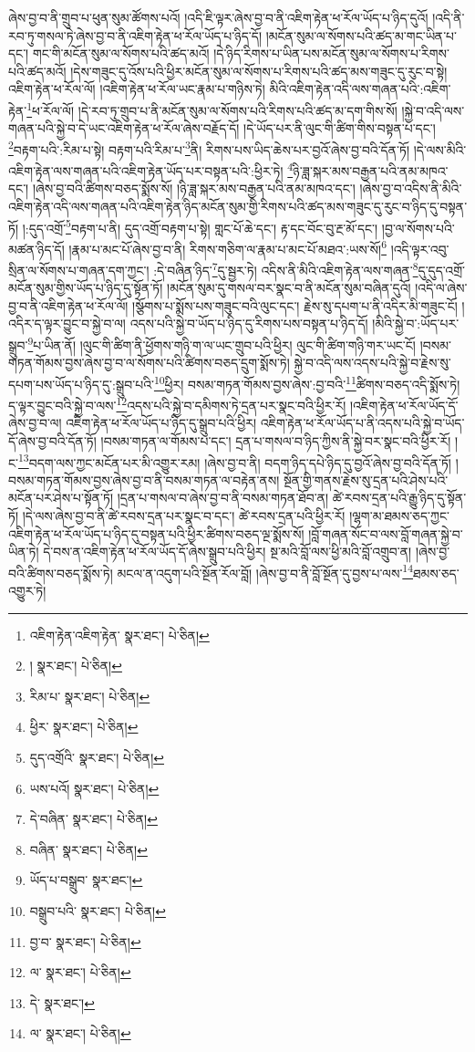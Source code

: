 ཞེས་བྱ་བ་ནི་གྲུབ་པ་ཕུན་སུམ་ཚོགས་པའོ། །འདི་ཇི་ལྟར་ཞེས་བྱ་བ་ནི་འཇིག་རྟེན་ཕ་རོལ་ཡོད་པ་ཉིད་དུའོ། །འདི་ནི་རབ་ཏུ་གསལ་ཏེ་ཞེས་བྱ་བ་ནི་འཇིག་རྟེན་ཕ་རོལ་ཡོད་པ་ཉིད་དོ། །མངོན་སུམ་ལ་སོགས་པའི་ཚད་མ་གང་ཡིན་པ་དང་། གང་གི་མངོན་སུམ་ལ་སོགས་པའི་ཚད་མའོ། །དེ་ཉིད་རིགས་པ་ཡིན་པས་མངོན་སུམ་ལ་སོགས་པ་རིགས་པའི་ཚད་མའོ། །དེས་གཟུང་དུ་འོས་པའི་ཕྱིར་མངོན་སུམ་ལ་སོགས་པ་རིགས་པའི་ཚད་མས་གཟུང་དུ་རུང་བ་སྟེ། འཇིག་རྟེན་ཕ་རོལ་ལོ། །འཇིག་རྟེན་ཕ་རོལ་ཡང་རྣམ་པ་གཉིས་ཏེ། མིའི་འཇིག་རྟེན་འདི་ལས་གཞན་པའི་:འཇིག་རྟེན་\footnote{འཇིག་རྟེན་འཇིག་རྟེན་  སྣར་ཐང་།  པེ་ཅིན། }ཕ་རོལ་ལོ། །དེ་རབ་ཏུ་གྲུབ་པ་ནི་མངོན་སུམ་ལ་སོགས་པའི་རིགས་པའི་ཚད་མ་དག་གིས་སོ། །སྐྱེ་བ་འདི་ལས་གཞན་པའི་སྐྱེ་བ་དེ་ཡང་འཇིག་རྟེན་ཕ་རོལ་ཞེས་བརྗོད་དོ། །དེ་ཡོད་པར་ནི་ལུང་གི་ཚིག་གིས་བསྟན་པ་དང་། \footnote{།    སྣར་ཐང་།  པེ་ཅིན། }བརྟག་པའི་:རིམ་པ་སྟེ། བརྟག་པའི་རིམ་པ་\footnote{རིམ་པ་  སྣར་ཐང་།  པེ་ཅིན། }ནི། རིགས་པས་ཡིད་ཆེས་པར་བྱའོ་ཞེས་བྱ་བའི་དོན་ཏོ། །དེ་ལས་མིའི་འཇིག་རྟེན་ལས་གཞན་པའི་འཇིག་རྟེན་ཡོད་པར་བསྟན་པའི་:ཕྱིར་ཏེ། \footnote{ཕྱིར་  སྣར་ཐང་།  པེ་ཅིན། }ཉི་ཟླ་སྐར་མས་བརྒྱན་པའི་ནམ་མཁའ་དང་། །ཞེས་བྱ་བའི་ཚིགས་བཅད་སྨོས་སོ། །ཉི་ཟླ་སྐར་མས་བརྒྱན་པའི་ནམ་མཁའ་དང་། །ཞེས་བྱ་བ་འདིས་ནི་མིའི་འཇིག་རྟེན་འདི་ལས་གཞན་པའི་འཇིག་རྟེན་ཉིད་མངོན་སུམ་གྱི་རིགས་པའི་ཚད་མས་གཟུང་དུ་རུང་བ་ཉིད་དུ་བསྟན་ཏོ། །:དུད་འགྲོ་\footnote{དུད་འགྲོའི་  སྣར་ཐང་།  པེ་ཅིན། }བརྟག་པ་ནི། དུད་འགྲོ་བརྟག་པ་སྟེ། གླང་པོ་ཆེ་དང་། རྟ་དང་བོང་བུ་རྔ་མོ་དང་། །བྱ་ལ་སོགས་པའི་མཚན་ཉིད་དོ། །རྣམ་པ་མང་པོ་ཞེས་བྱ་བ་ནི། རིགས་གཅིག་ལ་རྣམ་པ་མང་པོ་མཐའ་:ཡས་སོ།\footnote{ཡས་པའོ།  སྣར་ཐང་།  པེ་ཅིན། } །འདི་ལྟར་འབུ་སྲིན་ལ་སོགས་པ་གཞན་དག་ཀྱང་། :དེ་བཞིན་ཉིད་\footnote{དེ་བཞིན་  སྣར་ཐང་།  པེ་ཅིན། }དུ་སྦྱར་ཏེ། འདིས་ནི་མིའི་འཇིག་རྟེན་ལས་གཞན་\footnote{བཞིན་  སྣར་ཐང་།  པེ་ཅིན། }དུ་དུད་འགྲོ་མངོན་སུམ་གྱིས་ཡོད་པ་ཉིད་དུ་སྟོན་ཏོ། །མངོན་སུམ་དུ་གསལ་བར་སྣང་བ་ནི་མངོན་སུམ་བཞིན་དུའོ། །འདི་ལ་ཞེས་བྱ་བ་ནི་འཇིག་རྟེན་ཕ་རོལ་ལོ། །སྩོགས་པ་སྨོས་པས་གཟུང་བའི་ལུང་དང་། རྗེས་སུ་དཔག་པ་ནི་འདིར་མི་གཟུང་ངོ། །འདིར་ད་ལྟར་བྱུང་བ་སྐྱེ་བ་ལ། འདས་པའི་སྐྱེ་བ་ཡོད་པ་ཉིད་དུ་རིགས་པས་བསྟན་པ་ཉིད་དོ། །མིའི་སྐྱེ་བ་:ཡོད་པར་སྒྲུབ་\footnote{ཡོད་པ་བསྒྲུབ་  སྣར་ཐང་། }པ་ཡིན་ནོ། །ལུང་གི་ཚིག་ནི་ཕྱོགས་གཉི་ག་ལ་ཡང་གྲུབ་པའི་ཕྱིར། ལུང་གི་ཚིག་གཉི་གར་ཡང་ངོ། །བསམ་གཏན་གོམས་བྱས་ཞེས་བྱ་བ་ལ་སོགས་པའི་ཚིགས་བཅད་དྲུག་སྨོས་ཏེ། སྐྱེ་བ་འདི་ལས་འདས་པའི་སྐྱེ་བ་རྗེས་སུ་དཔག་པས་ཡོད་པ་ཉིད་དུ་:སྒྲུབ་པའི་\footnote{བསྒྲུབ་པའི་  སྣར་ཐང་།  པེ་ཅིན། }ཕྱིར། བསམ་གཏན་གོམས་བྱས་ཞེས་:བྱ་བའི་\footnote{བྱ་བ་  སྣར་ཐང་།  པེ་ཅིན། }ཚིགས་བཅད་འདི་སྨོས་ཏེ། ད་ལྟར་བྱུང་བའི་སྐྱེ་བ་ལས་\footnote{ལ་  སྣར་ཐང་།  པེ་ཅིན། }འདས་པའི་སྐྱེ་བ་དམིགས་ཏེ་དྲན་པར་སྣང་བའི་ཕྱིར་རོ། །འཇིག་རྟེན་ཕ་རོལ་ཡོད་དོ་ཞེས་བྱ་བ་ལ། འཇིག་རྟེན་ཕ་རོལ་ཡོད་པ་ཉིད་དུ་སྒྲུབ་པའི་ཕྱིར། འཇིག་རྟེན་ཕ་རོལ་ཡོད་པ་ནི་འདས་པའི་སྐྱེ་བ་ཡོད་དོ་ཞེས་བྱ་བའི་དོན་ཏོ། །བསམ་གཏན་ལ་གོམས་པ་དང་། དྲན་པ་གསལ་བ་ཉིད་ཀྱིས་ནི་སྐྱེ་བར་སྣང་བའི་ཕྱིར་རོ། །ང་\footnote{དེ་  སྣར་ཐང་། }བདག་ལས་ཀྱང་མངོན་པར་མི་འགྱུར་རམ། །ཞེས་བྱ་བ་ནི། བདག་ཉིད་དཔེ་ཉིད་དུ་བྱའོ་ཞེས་བྱ་བའི་དོན་ཏོ། །བསམ་གཏན་གོམས་བྱས་ཞེས་བྱ་བ་ནི་བསམ་གཏན་ལ་བརྟེན་ནས། སྔོན་གྱི་གནས་རྗེས་སུ་དྲན་པའི་ཤེས་པའི་མངོན་པར་ཤེས་པ་སྟོན་ཏོ། །དྲན་པ་གསལ་བ་ཞེས་བྱ་བ་ནི་བསམ་གཏན་ཐོབ་ན། ཚེ་རབས་དྲན་པའི་རྒྱུ་ཉིད་དུ་སྟོན་ཏོ། །དེ་ལས་ཞེས་བྱ་བ་ནི་ཚེ་རབས་དྲན་པར་སྣང་བ་དང་། ཚེ་རབས་དྲན་པའི་ཕྱིར་རོ། །ལྷག་མ་ཐམས་ཅད་ཀྱང་འཇིག་རྟེན་ཕ་རོལ་ཡོད་པ་ཉིད་དུ་བསྟན་པའི་ཕྱིར་ཚིགས་བཅད་ལྔ་སྨོས་སོ། །བློ་གཞན་སོང་བ་ལས་བློ་གཞན་སྐྱེ་བ་ཡིན་ཏེ། དེ་བས་ན་འཇིག་རྟེན་ཕ་རོལ་ཡོད་དོ་ཞེས་སྒྲུབ་པའི་ཕྱིར། སྔ་མའི་བློ་ལས་ཕྱི་མའི་བློ་འགྲུབ་ན། །ཞེས་བྱ་བའི་ཚིགས་བཅད་སྨོས་ཏེ། མངལ་ན་འདུག་པའི་སྔོན་རོལ་བློ། །ཞེས་བྱ་བ་ནི་བློ་སྔོན་དུ་བྱས་པ་ལས་\footnote{ལ་  སྣར་ཐང་།  པེ་ཅིན། }ཐམས་ཅད་འགྱུར་ཏེ། 